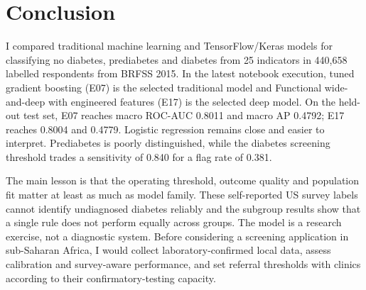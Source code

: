 \section{Conclusion}
\label{sec:conclusion}

I compared traditional machine learning and TensorFlow/Keras models for classifying no diabetes, prediabetes and diabetes from 25 indicators in 440,658 labelled respondents from BRFSS 2015. In the latest notebook execution, tuned gradient boosting (E07) is the selected traditional model and Functional wide-and-deep with engineered features (E17) is the selected deep model. On the held-out test set, E07 reaches macro ROC-AUC 0.8011 and macro AP 0.4792; E17 reaches 0.8004 and 0.4779. Logistic regression remains close and easier to interpret. Prediabetes is poorly distinguished, while the diabetes screening threshold trades a sensitivity of 0.840 for a flag rate of 0.381.

The main lesson is that the operating threshold, outcome quality and population fit matter at least as much as model family. These self-reported US survey labels cannot identify undiagnosed diabetes reliably and the subgroup results show that a single rule does not perform equally across groups. The model is a research exercise, not a diagnostic system. Before considering a screening application in sub-Saharan Africa, I would collect laboratory-confirmed local data, assess calibration and survey-aware performance, and set referral thresholds with clinics according to their confirmatory-testing capacity.
